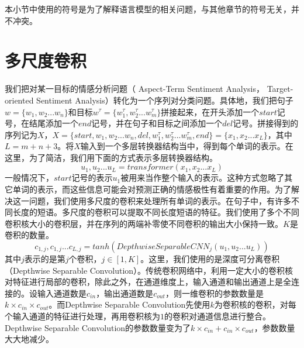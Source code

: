 本小节中使用的符号是为了解释语言模型的相关问题，与其他章节的符号无关，并不冲突。
\section{多尺度卷积}
我们把对某一目标的情感分析问题（ Aspect-Term Sentiment Analysis， Target-oriented Sentiment Analysis）转化为一个序列对分类问题。具体地，我们把句子$w=\{w_1,w_2...w_n\}$和目标$w^\tau=\{w^\tau_1,w^\tau_2...w^\tau_m\}$拼接起来，在开头添加一个$start$记号，在结尾添加一个$end$记号，并在句子和目标之间添加一个$del$记号。拼接得到的序列记为$X$，$X=\{start,w_1,w_2...w_n,del,w^\tau_1,w^\tau_2...w^\tau_m,end\}=\{x_1,x_2...x_L\}$，其中$L=m+n+3$。将$X$输入到一个多层转换器结构当中，得到每个单词的表示。在这里，为了简洁，我们用下面的方式表示多层转换器结构。
\begin{equation}
    u_1,u_2...u_L=transformer(x_1,x_2...x_L)
\end{equation}
一般情况下，$start$记号的表示$u_1$被用来当作整个输入的表示。这种方式忽略了其它单词的表示，而这些信息可能会对预测正确的情感极性有着重要的作用。为了解决这一问题，我们使用多尺度的卷积来处理所有单词的表示。在句子中，有许多不同长度的短语。多尺度的卷积可以提取不同长度短语的特征。我们使用了多个不同卷积核大小的卷积层，并在序列的两端补零使不同卷积的输出大小保持一致。$K$是卷积的数量。
\begin{equation}
    c_{1,j},c_{1,j}...c_{L,j}=tanh(DepthwiseSeparableCNN_{j}(u_1,u_2...u_L))
\end{equation}
其中$j$表示的是第$j$个卷积，$j\in[1,K]$。这里，我们使用的是深度可分离卷积（Depthwise Separable Convolution）\cite{chollet2017xception,kaiser2017depthwise}。传统卷积网络中，利用一定大小的卷积核对特征进行局部的卷积，除此之外，在通道维度上，输入通道和输出通道上是全连接的。设输入通道数是$c_{in}$，输出通道数是$c_{out}$，则一维卷积的参数数量是$k\times c_{in}\times c_{out}$。而Depthwise Separable Convolution先使用$k$为卷积核的卷积，对每个输入通道的特征进行处理，再用卷积核为$1$的卷积对通道信息进行整合。Depthwise Separable Convolution的参数数量变为了$k\times c_{in}+c_{in}\times c_{out}$，参数数量大大地减少。

